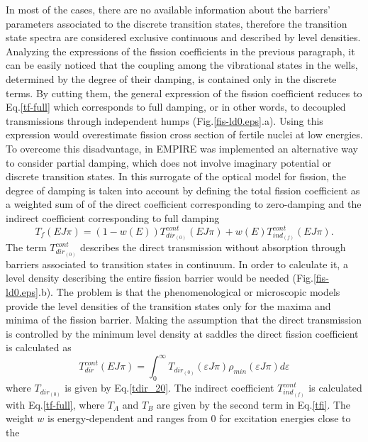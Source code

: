 In most of the cases, there are no available information about the barriers'
parameters associated to the discrete transition states, therefore the
transition state spectra are considered exclusive continuous and described
by level densities. Analyzing the expressions of the fission coefficients in
the previous paragraph, it can be easily noticed that the coupling among the
vibrational states in the wells, determined by the degree of their damping,
is contained only in the discrete terms. By cutting them, the general
expression of the fission coefficient reduces to Eq.\ref{tf-full} which
corresponds to full damping, or in other words, to decoupled transmissions
through independent humps (Fig.\ref{fis-ld0.eps}.a). Using this expression
would overestimate fission cross section of fertile nuclei at low energies.
To overcome this disadvantage, in EMPIRE was implemented an alternative way
to consider partial damping, which does not involve imaginary potential or
discrete transition states. In this surrogate of the optical model for
fission, the degree of damping is taken into account by defining the total
fission coefficient as a weighted sum of of the direct coefficient
corresponding to zero-damping and the indirect coefficient corresponding to
full damping
\begin{equation}
T_{f}(E J \pi)=(1-w(E))T_{dir_{(0)}}^{cont}(E J
\pi)+w(E)T_{ind_{(f)}}^{cont}(E J \pi).  \label{tfsurr}
\end{equation}
The term $T_{dir_{(0)}}^{cont}$ describes the direct transmission without
absorption through barriers associated to transition states in continuum. In
order to calculate it, a level density describing the entire fission barrier
would be needed (Fig.\ref{fis-ld0.eps}.b). The problem is that the
phenomenological or microscopic models provide the level densities of the
transition states only for the maxima and minima of the fission barrier.
Making the assumption that the direct transmission is controlled by the
minimum level density at saddles the direct fission coefficient is
calculated as
\begin{equation}
T_{dir}^{cont}(EJ\pi)=\int_0^{\infty}T_{dir_{(0)}}(\varepsilon J
\pi)\rho_{min} (\varepsilon J \pi) d \varepsilon
\end{equation}
where $T_{dir_{(0)}}$ is given by Eq.\ref{tdir_20}. The indirect coefficient
$T_{ind_{(f)}}^{cont}$ is calculated with Eq.\ref{tf-full}, where $T_A$ and $%
T_B$ are given by the second term in Eq.\ref{tfi}. The weight $w$ is
energy-dependent and ranges from 0 for excitation energies close to the
